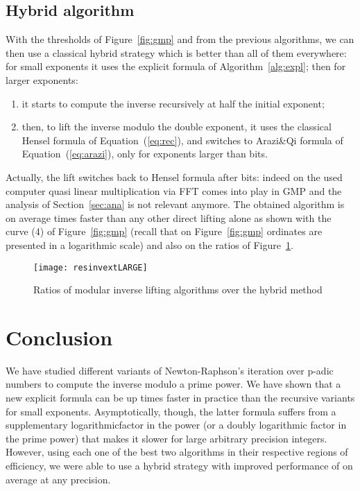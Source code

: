 \subsection{Hybrid algorithm}




With the thresholds of Figure~\ref{fig:gmp} and from the previous algorithms, 
we can then use a classical hybrid strategy which is better than
all of them everywhere:
for small exponents it uses the explicit formula of Algorithm~\ref{alg:expl};
then for larger exponents:
\begin{enumerate}
\item it starts to compute the inverse recursively at half the initial exponent;
\item then, to lift the inverse modulo the double exponent, it uses the classical Hensel formula of Equation~(\ref{eq:rec}), and
  switches to Arazi\&Qi formula of Equation~(\ref{eq:arazi}), only for exponents
  larger than  bits. 
\end{enumerate}
Actually, the lift switches back to Hensel formula after  bits: indeed on
the used computer quasi linear multiplication via FFT comes into play in GMP and
the analysis of Section~\ref{sec:ana} is not relevant anymore.
The obtained algorithm is on average  times faster than any
other direct lifting alone as shown with the curve (4) of
Figure~\ref{fig:gmp} (recall that on Figure~\ref{fig:gmp} ordinates are
presented in a logarithmic scale) and also on the ratios of
Figure~\ref{fig:ratio}.
\begin{figure}[htb]\center\vspace{-2pt}
\texttt{[image: resinvextLARGE]}
\caption{Ratios of modular inverse lifting algorithms over the hybrid method}\label{fig:ratio}\vspace{-2pt}
\end{figure}


\section{Conclusion}
We have studied different variants of Newton-Raphson's iteration over
p-adic numbers to compute the inverse modulo a prime power.
We have shown that a new explicit formula can be up  times faster in
practice than the recursive variants for small exponents.
Asymptotically, though, the latter formula suffers from a supplementary
logarithmicfactor in the power (or a doubly logarithmic factor in the prime
power) that makes it slower for large arbitrary precision integers. 
However, using each one of the best two algorithms in their respective regions
of efficiency, we were able to use a hybrid strategy with improved performance
of  on average at any precision.  

